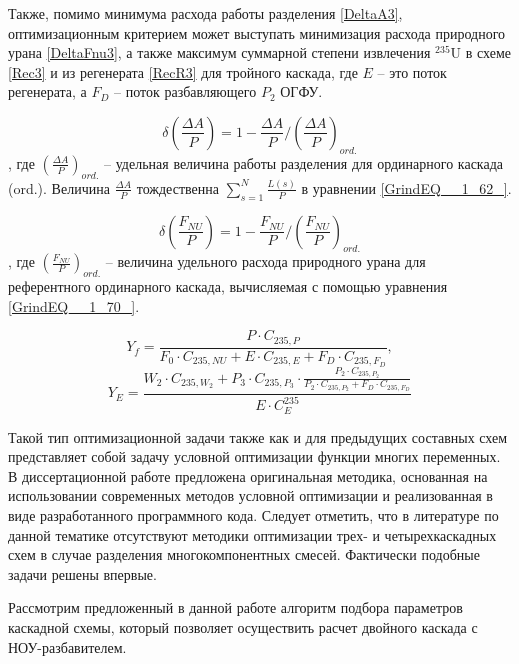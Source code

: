 Также, помимо минимума расхода работы разделения \ref{DeltaA3}, оптимизационным критерием может выступать минимизация расхода природного урана \ref{DeltaFnu3}, а также максимум суммарной степени извлечения $^{235}$U в схеме \ref{Rec3} и из регенерата \ref{RecR3} для тройного каскада, где $E$ -- это поток регенерата, а $F_D$ -- поток разбавляющего $P_2$ ОГФУ.

\begin{equation} \label{DeltaA} 
    \delta(\frac{\Delta A}{P})=1-\frac{\Delta A}{P}/(\frac{\Delta A}{P})_{ord.}
\end{equation}
, где $(\frac{\Delta A}{P})_{ord.}$ -- удельная величина работы разделения для ординарного каскада (ord.). Величина $\frac{\Delta A}{P}$ тождественна $\sum _{s=1}^{N}\frac{L(s)}{P}$ в уравнении \ref{GrindEQ__1_62_}.

\begin{equation} \label{DeltaFnu} 
\delta(\frac{F_{NU}}{P})=1-\frac{F_{NU}}{P}/(\frac{F_{NU}}{P})_{ord.}
\end{equation} 
, где $(\frac{F_{NU}}{P})_{ord.}$ -- величина удельного расхода природного урана для референтного ординарного каскада, вычисляемая с помощью уравнения \ref{GrindEQ__1_70_}.

\begin{equation} \label{Rec3} 
    Y_{f} = \frac{P \cdot C_{235,P}}{F_0 \cdot C_{235,NU} + E \cdot C_{235,E} + F_D \cdot C_{235,F_D}},
\end{equation} 
\begin{equation} \label{RecR3} 
    Y_{E} = \frac{W_2\cdot C_{235,W_2} + P_3\cdot C_{235,P_3}\cdot \frac{P_2\cdot C_{235,P_2}}{P_2\cdot C_{235,P_2}+ F_D \cdot C_{235,F_D}}}{E \cdot C_{E}^{235}}        
\end{equation} 

Такой тип оптимизационной задачи также как и для предыдущих составных схем представляет собой задачу условной оптимизации функции многих переменных. В диссертационной работе предложена оригинальная методика, основанная на использовании современных методов условной оптимизации и реализованная в виде разработанного программного кода.
Следует отметить, что в литературе по данной тематике отсутствуют методики оптимизации трех- и четырехкаскадных схем в случае разделения многокомпонентных смесей. Фактически подобные задачи решены впервые.

Рассмотрим предложенный в данной работе алгоритм подбора параметров каскадной схемы, который позволяет осуществить расчет двойного каскада с НОУ-разбавителем.

